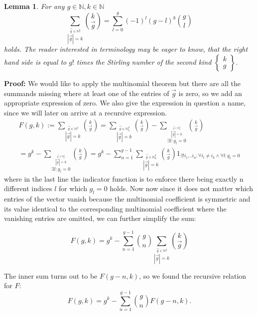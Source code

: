 \documentclass[b5paper,draft,openbib,12pt]{memoir}
\newtheorem{Lemma}[Def]{Lemma}
\begin{document}
\begin{Lemma}\label{stirling lemma}
For any \(g\in\mathbb{N},k\in\mathbb{N}\)
\begin{equation}
\sum_{\stackrel{\vec{g}\in\mathbb{N}^g}{|\vec{g}|=k}} \binom{k}{\vec{g}}=\sum_{l=0}^g (-1)^l (g-l)^k \binom{g}{l}
\end{equation}
holds. The reader interested in terminology may be eager to know, that the right hand side is equal to
 \(g!\) times the Stirling 
number of the second kind \(\left\{\begin{matrix}k\\g\end{matrix}\right\}\).
\end{Lemma}
\textbf{Proof:} We would like to apply the multinomial theorem but there are all the summands missing where at least
one of the entries of \(\vec{g}\) is zero, so we add an appropriate expression of zero. We also give the expression in
question a name, since we will later on arrive at a recursive expression.
\begin{multline}
F(g,k):=\sum_{\stackrel{\vec{g}\in\mathbb{N}^g}{|\vec{g}|=k}} \binom{k}{\vec{g}}
= \sum_{\stackrel{\vec{g}\in\mathbb{N}_0^g}{|\vec{g}|=k}} \binom{k}{\vec{g}}
- \sum_{\stackrel{\stackrel{\vec{g}\in\mathbb{N}_0^g}{|\vec{g}|=k}}{\exists l: g_l=0}} \binom{k}{\vec{g}}\\
= g^k 
 - \sum_{\stackrel{\stackrel{\vec{g}\in\mathbb{N}_0^g}{|\vec{g}|=k}}{\exists l: g_l=0}} \binom{k}{\vec{g}}
=g^k 
- \sum_{n=1}^{g-1} \sum_{\stackrel{\vec{g}\in\mathbb{N}_0^g}{|\vec{g}|=k}}
 \binom{k}{\vec{g}} 1_{\exists! i_1\dots i_n : \forall i_l\neq i_k \wedge \forall l :g_l=0}
\end{multline}
where in the last line the indicator function is to enforce there being exactly n different indices \(l\) for which \(g_l=0\)
holds. Now now since it does not matter which entries of the vector vanish because the multinomial coefficient 
is symmetric and its value identical to the corresponding multinomial coefficient where the vanishing entries
are omitted, we can further simplify the sum:

\begin{equation*}
F(g,k)= g^k -  \sum_{n=1}^{g-1} \binom{g}{n} \sum_{\stackrel{\vec{g}\in\mathbb{N}^g}{|\vec{g}|=k}}
 \binom{k}{\vec{g}}
\end{equation*}

The inner sum turns out to be \(F(g-n,k)\), so we found the recursive relation for \(F\):
\begin{equation}\label{combinatorics solution recursive}
F(g,k)= g^k -  \sum_{n=1}^{g-1} \binom{g}{n} F(g-n,k).
\end{equation}
\end{document}
